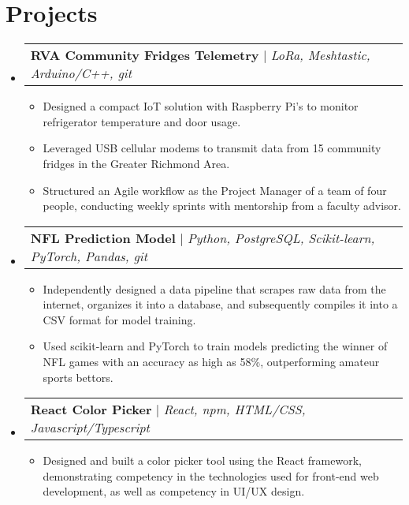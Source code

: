 \documentclass[letterpaper,11pt]{article}
\makeatletter
\newcommand{\resumeItem}[1]{
  \item\small{
    {#1 \vspace{-2pt}}
  }
}
\newcommand{\resumeProjectHeading}[2]{
    \item
    \begin{tabular*}{0.97\textwidth}{l@{\extracolsep{\fill}}r}
      \small#1 & #2 \\
    \end{tabular*}\vspace{-7pt}
}
\newcommand{\resumeSubHeadingListStart}{\begin{itemize}[leftmargin=0.15in, label={}]}
\newcommand{\resumeSubHeadingListEnd}{\end{itemize}}
\newcommand{\resumeItemListStart}{\begin{itemize}}
\newcommand{\resumeItemListEnd}{\end{itemize}\vspace{-5pt}}
\makeatother
\begin{document}
\section{Projects}
    \resumeSubHeadingListStart
      \resumeProjectHeading
      {\textbf{RVA Community Fridges Telemetry} $|$ \emph{LoRa, Meshtastic, Arduino/C++, git}}{}
        \resumeItemListStart
            \resumeItem{Designed a compact IoT solution with Raspberry Pi's to monitor refrigerator temperature and door usage.}
            \resumeItem{Leveraged USB cellular modems to transmit data from 15 community fridges in the Greater Richmond Area.}
            \resumeItem{Structured an Agile workflow as the Project Manager of a team of four people, conducting weekly sprints with mentorship from a faculty advisor. }
        \resumeItemListEnd
      \resumeProjectHeading
      {\textbf{NFL Prediction Model} $|$ \emph{Python, PostgreSQL, Scikit-learn, PyTorch, Pandas, git}}{}
        \resumeItemListStart
          \resumeItem{Independently designed a data pipeline that scrapes raw data from the internet, organizes it into a database, and subsequently compiles it into a CSV format for model training.}
          \resumeItem{Used scikit-learn and PyTorch to train models predicting the winner of NFL games with an accuracy as high as 
          58\%, outperforming amateur sports bettors.}
        \resumeItemListEnd
      \resumeProjectHeading
      {\textbf{React Color Picker} $|$ \emph{React, npm, HTML/CSS, Javascript/Typescript}}{}
          \resumeItemListStart
            \resumeItem{Designed and built a color picker tool using the React framework, demonstrating competency in the technologies used for front-end web development, as well as competency in UI/UX design. }
          \resumeItemListEnd
    \resumeSubHeadingListEnd



%


\end{document}
